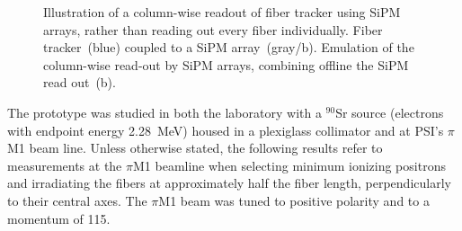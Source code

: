 \begin{refsection}
        \begin{figure}
            \centering
            \hspace{0.2\columnwidth}
            \caption[Fiber tracker read-out column-wise by SiPM arrays ]{Illustration of a column-wise readout of fiber tracker using SiPM arrays, rather than reading out every fiber individually. Fiber tracker~(blue) coupled to a SiPM array~(gray/b). Emulation of the column-wise read-out by SiPM arrays, combining offline the SiPM read out~(b).}
            \label{fig:sipmarray}
        \end{figure}
        
        The prototype was studied in both the laboratory with a $^{90}$Sr source (electrons with endpoint energy \SI{2.28}{MeV}) housed in a plexiglass collimator and at PSI's $\pi$M1 beam line. Unless otherwise stated, the following results refer to measurements at the $\pi$M1 beamline when selecting minimum ionizing positrons and irradiating the fibers at approximately half the fiber length, perpendicularly to their central axes. The $\pi$M1 beam was tuned to positive polarity and to a momentum of \SI{115}{\MeVc}. 
        

\end{refsection}

